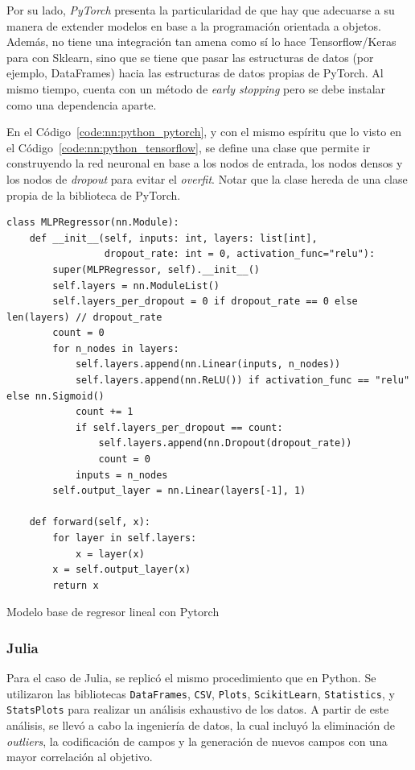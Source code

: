 \documentclass[11pt]{article}
\let\Oldsubsubsection\subsubsection
\renewcommand{\subsubsection}{\FloatBarrier\Oldsubsubsection}
\newcommand{\english}[1]{\textit{#1}}
\begin{document}
Por su lado, \english{PyTorch} presenta la particularidad de que hay que adecuarse a su manera de extender modelos en base a la programación orientada a objetos. Además, no tiene una integración tan amena como sí lo hace Tensorflow/Keras para con Sklearn, sino que se tiene que pasar las estructuras de datos (por ejemplo, DataFrames) hacia las estructuras de datos propias de PyTorch. Al mismo tiempo, cuenta con un método de \english{early stopping} pero se debe instalar como una dependencia aparte.

En el Código~\ref{code:nn:python_pytorch}, y con el mismo espíritu que lo visto en el Código~\ref{code:nn:python_tensorflow}, se define una clase que permite ir construyendo la red neuronal en base a los nodos de entrada, los nodos densos y los nodos de \english{dropout} para evitar el \english{overfit}. Notar que la clase hereda de una clase propia de la biblioteca de PyTorch.

\begin{listing}[H]
\begin{verbatim}
class MLPRegressor(nn.Module):
    def __init__(self, inputs: int, layers: list[int],
                 dropout_rate: int = 0, activation_func="relu"):
        super(MLPRegressor, self).__init__()
        self.layers = nn.ModuleList()
        self.layers_per_dropout = 0 if dropout_rate == 0 else len(layers) // dropout_rate
        count = 0
        for n_nodes in layers:
            self.layers.append(nn.Linear(inputs, n_nodes))
            self.layers.append(nn.ReLU()) if activation_func == "relu" else nn.Sigmoid()
            count += 1
            if self.layers_per_dropout == count:
                self.layers.append(nn.Dropout(dropout_rate))
                count = 0
            inputs = n_nodes
        self.output_layer = nn.Linear(layers[-1], 1)
        
    def forward(self, x):
        for layer in self.layers:
            x = layer(x)
        x = self.output_layer(x)
        return x
\end{verbatim}
\caption{Modelo base de regresor lineal con Pytorch}
\label{code:nn:python_pytorch}
\end{listing}

\subsubsection{Julia}

Para el caso de Julia, se replicó el mismo procedimiento que en Python. Se utilizaron las bibliotecas \lstinline{DataFrames}, \lstinline{CSV}, \lstinline{Plots}, \lstinline{ScikitLearn}, \lstinline{Statistics}, y \lstinline{StatsPlots} para realizar un análisis exhaustivo de los datos. A partir de este análisis, se llevó a cabo la ingeniería de datos, la cual incluyó la eliminación de \textit{outliers}, la codificación de campos y la generación de nuevos campos con una mayor correlación al objetivo.
\end{document}
